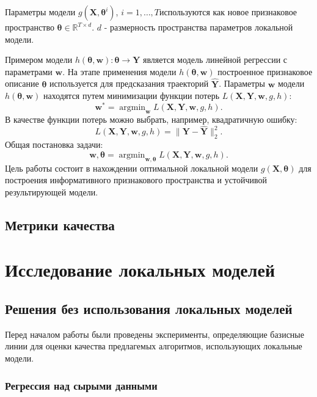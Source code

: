 \documentclass{mipt-thesis-bs}
\newcommand{\argmin}{\mathop{\mathrm{argmin}}}
\begin{document}
Параметры модели $g(\mathbf{X}, \mathbf{\theta}^i)$, $i = 1,\dots,T$используются как новое признаковое пространство $\mathbf{\theta}\in\mathbb{R}^{T\times d}$. $d$ - размерность пространства параметров локальной модели.

Примером модели $h(\mathbf{\theta}, \mathbf{w}): \mathbf{\theta}\to\mathbf{Y}$ является модель линейной регрессии с параметрами $\mathbf{w}$. На этапе применения модели $h(\mathbf{\theta}, \mathbf{w})$ построенное признаковое описание $\mathbf{\theta}$ используется для предсказания траекторий $\mathbf{\hat{Y}}$.
Параметры $\mathbf{w}$ модели $h(\mathbf{\theta}, \mathbf{w})$ находятся путем минимизации функции потерь $L(\mathbf{X}, \mathbf{Y}, \mathbf{w}, g, h)$:
\begin{equation}
\mathbf{w^*} = \argmin_{\mathbf{w}} L(\mathbf{X}, \mathbf{Y}, \mathbf{w}, g, h).
\end{equation}
В качестве функции потерь можно выбрать, например, квадратичную ошибку:
\begin{equation}
L(\mathbf{X}, \mathbf{Y}, \mathbf{w}, g, h) = \|\mathbf{Y}-\mathbf{\hat{Y}}\|^2_2.
\end{equation}
Общая постановка задачи:
\begin{equation}
\mathbf{w}, \mathbf{\theta} = \argmin_{\mathbf{w}, \mathbf{\theta}} L(\mathbf{X}, \mathbf{Y}, \mathbf{w}, g, h).
\end{equation}
Цель работы состоит в нахождении оптимальной локальной модели $g(\mathbf{X}, \mathbf{\theta})$ для построения информативного признакового пространства и устойчивой результирующей модели.
\section{Метрики качества}

\chapter{Исследование локальных моделей}
\section{Решения без использования локальных моделей}
Перед началом работы были проведены эксперименты, определяющие базисные линии для оценки качества предлагемых алгоритмов, использующих локальные модели.
\subsection{Регрессия над сырыми данными}
\end{document}
